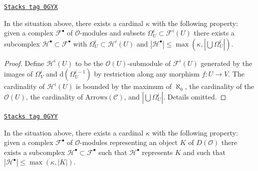 \begin{lemma}
\label{sites-cohomology-lemma-build-from}
\href{https://stacks.math.columbia.edu/tag/0GYX}{\texttt{Stacks tag 0GYX}}

In the situation above, there exists a cardinal $\kappa$ with the
following property: given a complex $\mathcal{F}^\bullet$ of
$\mathcal{O}$-modules and subsets $\Omega^i_U \subset \mathcal{F}^i(U)$
there exists a subcomplex $\mathcal{H}^\bullet \subset \mathcal{F}^\bullet$
with $\Omega^i_U \subset \mathcal{H}^i(U)$ and
$|\mathcal{H}^\bullet| \leq \max(\kappa, |\bigcup \Omega^i_U|)$.
\end{lemma}

\begin{proof}
Define $\mathcal{H}^i(U)$ to be the
$\mathcal{O}(U)$-submodule of $\mathcal{F}^i(U)$
generated by the images of $\Omega^i_V$ and $\text{d}(\Omega^{i - 1}_U)$
by restriction along any morphism $f : U \to V$.
The cardinality of $\mathcal{H}^i(U)$ is bounded
by the maximum of $\aleph_0$, the cardinality of the $\mathcal{O}(U)$,
the cardinality of $\text{Arrows}(\mathcal{C})$, and $|\bigcup \Omega^i_U|$.
Details omitted.
\end{proof}

\begin{lemma}
\label{sites-cohomology-lemma-qis-small}
\href{https://stacks.math.columbia.edu/tag/0GYY}{\texttt{Stacks tag 0GYY}}

In the situation above, there exists a cardinal $\kappa$ with the
following property: given a complex $\mathcal{F}^\bullet$ of
$\mathcal{O}$-modules representing an object $K$ of $D(\mathcal{O})$
there exists a subcomplex $\mathcal{H}^\bullet \subset \mathcal{F}^\bullet$
such that $\mathcal{H}^\bullet$ represents $K$ and such that
$|\mathcal{H}^\bullet| \leq \max(\kappa, |K|)$.
\end{lemma}

